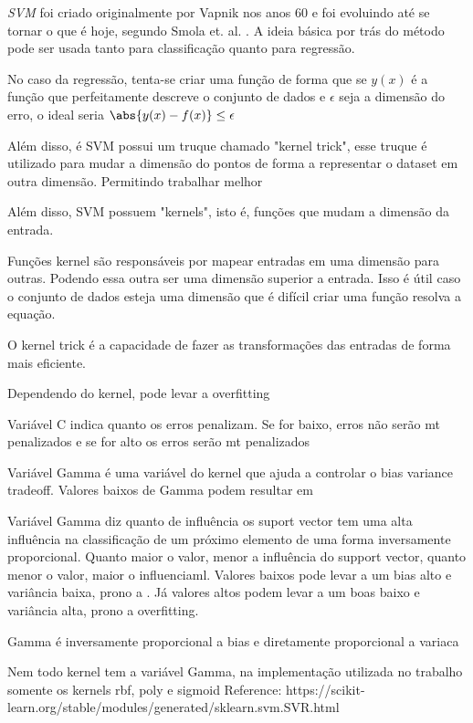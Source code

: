 \textit{\acrshort{SVM}} foi criado originalmente por Vapnik nos anos 60 e foi evoluindo até se tornar o que é hoje, segundo Smola et. al. \cite{Smola03atutorial}. A ideia básica por trás do método pode ser usada tanto para classificação quanto para regressão. 

No caso da regressão, tenta-se criar uma função  de forma que se \(y(x)\) é a função que perfeitamente descreve o conjunto de dados e \(\epsilon\) seja a dimensão do erro, o ideal seria \(\abs{y(x) - f(x)} \leq \epsilon \)

Além disso, é SVM possui um truque chamado "kernel trick", esse truque é utilizado para mudar a dimensão do pontos de forma a representar o dataset em outra dimensão. Permitindo trabalhar melhor

Além disso, SVM possuem "kernels", isto é, funções que mudam a dimensão da entrada. 

Funções kernel são responsáveis por mapear entradas em uma dimensão para outras. Podendo essa outra ser uma dimensão superior a entrada. Isso é útil caso o conjunto de dados esteja uma dimensão que é difícil criar uma função resolva a equação.

O kernel trick é a capacidade de fazer as transformações das entradas de forma mais eficiente.

Dependendo do kernel, pode levar a overfitting

Variável C indica quanto os erros penalizam. Se for baixo, erros não serão mt penalizados e se for alto os erros serão mt penalizados

Variável Gamma é uma variável do kernel que ajuda a controlar o bias variance tradeoff. Valores baixos de Gamma podem resultar em

Variável Gamma diz quanto de influência os suport vector tem uma alta influência na classificação de um próximo elemento de uma forma inversamente proporcional. Quanto maior o valor, menor a influência do support vector, quanto menor o valor, maior o influenciaml. Valores baixos pode levar a um bias alto e variância baixa, prono a . Já valores altos podem levar a um boas baixo e variância alta, prono a overfitting.

Gamma é inversamente proporcional a bias e diretamente proporcional a variaca

Nem todo kernel tem a variável Gamma, na implementação utilizada no trabalho somente os kernels rbf, poly e sigmoid 
Reference: https://scikit-learn.org/stable/modules/generated/sklearn.svm.SVR.html




